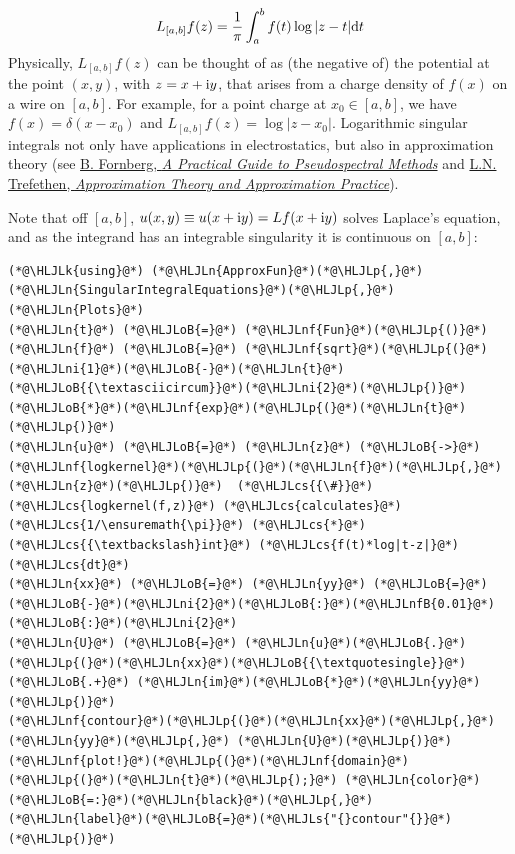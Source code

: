 \documentclass[12pt,landscape]{article}
\newcommand{\HLJLk}[1]{\textcolor[RGB]{148,91,176}{\textbf{#1}}}
\newcommand{\HLJLn}[1]{#1}
\newcommand{\HLJLnf}[1]{\textcolor[RGB]{66,102,213}{#1}}
\newcommand{\HLJLs}[1]{\textcolor[RGB]{201,61,57}{#1}}
\newcommand{\HLJLnfB}[1]{\textcolor[RGB]{59,151,46}{#1}}
\newcommand{\HLJLni}[1]{\textcolor[RGB]{59,151,46}{#1}}
\newcommand{\HLJLoB}[1]{\textcolor[RGB]{102,102,102}{\textbf{#1}}}
\newcommand{\HLJLp}[1]{#1}
\newcommand{\HLJLcs}[1]{\textcolor[RGB]{153,153,119}{\textit{#1}}}
\def\D{ {\rm d} }
\def\I{ {\rm i} }
\def\dt{\D t}
\begin{document}
{\[
L_{[a,b]} f(z) = {1 \over \pi }\int_a^b f(t) \log | z - t| \dt
\]
Physically, $L_{[a,b]} f(z)$ can be thought of as (the negative of) the potential at the point $(x, y)$, with $z = x + \I y$, that arises from a charge density of $f(x)$ on a wire on $[a, b]$.  For example, for a point charge at $x_0 \in [a, b]$, we have $f(x) = \delta(x-x_0)$ and  $L_{[a,b]} f(z) = \log | z - x_0|$. Logarithmic singular integrals not only have applications in electrostatics, but also in approximation theory (see \href{https://www.imperial.ac.uk/admin-services/library/}{B. Fornberg, \emph{A Practical Guide to Pseudospectral Methods}} and \href{https://www.imperial.ac.uk/admin-services/library/}{L.N. Trefethen, \emph{Approximation Theory and Approximation Practice}}).

Note that off $[a,b]$, $u(x,y) \equiv u(x+\I y) = L f(x+\I y)$ solves Laplace's equation, and as the integrand has an integrable singularity it is continuous on $[a,b]$:


\begin{lstlisting}
(*@\HLJLk{using}@*) (*@\HLJLn{ApproxFun}@*)(*@\HLJLp{,}@*) (*@\HLJLn{SingularIntegralEquations}@*)(*@\HLJLp{,}@*) (*@\HLJLn{Plots}@*)
(*@\HLJLn{t}@*) (*@\HLJLoB{=}@*) (*@\HLJLnf{Fun}@*)(*@\HLJLp{()}@*)
(*@\HLJLn{f}@*) (*@\HLJLoB{=}@*) (*@\HLJLnf{sqrt}@*)(*@\HLJLp{(}@*)(*@\HLJLni{1}@*)(*@\HLJLoB{-}@*)(*@\HLJLn{t}@*)(*@\HLJLoB{{\textasciicircum}}@*)(*@\HLJLni{2}@*)(*@\HLJLp{)}@*)(*@\HLJLoB{*}@*)(*@\HLJLnf{exp}@*)(*@\HLJLp{(}@*)(*@\HLJLn{t}@*)(*@\HLJLp{)}@*)
(*@\HLJLn{u}@*) (*@\HLJLoB{=}@*) (*@\HLJLn{z}@*) (*@\HLJLoB{->}@*) (*@\HLJLnf{logkernel}@*)(*@\HLJLp{(}@*)(*@\HLJLn{f}@*)(*@\HLJLp{,}@*) (*@\HLJLn{z}@*)(*@\HLJLp{)}@*)  (*@\HLJLcs{{\#}}@*) (*@\HLJLcs{logkernel(f,z)}@*) (*@\HLJLcs{calculates}@*) (*@\HLJLcs{1/\ensuremath{\pi}}@*) (*@\HLJLcs{*}@*) (*@\HLJLcs{{\textbackslash}int}@*) (*@\HLJLcs{f(t)*log|t-z|}@*) (*@\HLJLcs{dt}@*)
(*@\HLJLn{xx}@*) (*@\HLJLoB{=}@*) (*@\HLJLn{yy}@*) (*@\HLJLoB{=}@*) (*@\HLJLoB{-}@*)(*@\HLJLni{2}@*)(*@\HLJLoB{:}@*)(*@\HLJLnfB{0.01}@*)(*@\HLJLoB{:}@*)(*@\HLJLni{2}@*)
(*@\HLJLn{U}@*) (*@\HLJLoB{=}@*) (*@\HLJLn{u}@*)(*@\HLJLoB{.}@*)(*@\HLJLp{(}@*)(*@\HLJLn{xx}@*)(*@\HLJLoB{{\textquotesingle}}@*) (*@\HLJLoB{.+}@*) (*@\HLJLn{im}@*)(*@\HLJLoB{*}@*)(*@\HLJLn{yy}@*)(*@\HLJLp{)}@*)
(*@\HLJLnf{contour}@*)(*@\HLJLp{(}@*)(*@\HLJLn{xx}@*)(*@\HLJLp{,}@*) (*@\HLJLn{yy}@*)(*@\HLJLp{,}@*) (*@\HLJLn{U}@*)(*@\HLJLp{)}@*)
(*@\HLJLnf{plot!}@*)(*@\HLJLp{(}@*)(*@\HLJLnf{domain}@*)(*@\HLJLp{(}@*)(*@\HLJLn{t}@*)(*@\HLJLp{);}@*) (*@\HLJLn{color}@*)(*@\HLJLoB{=:}@*)(*@\HLJLn{black}@*)(*@\HLJLp{,}@*) (*@\HLJLn{label}@*)(*@\HLJLoB{=}@*)(*@\HLJLs{"{}contour"{}}@*)(*@\HLJLp{)}@*)
\end{lstlisting}

}
\end{document}
